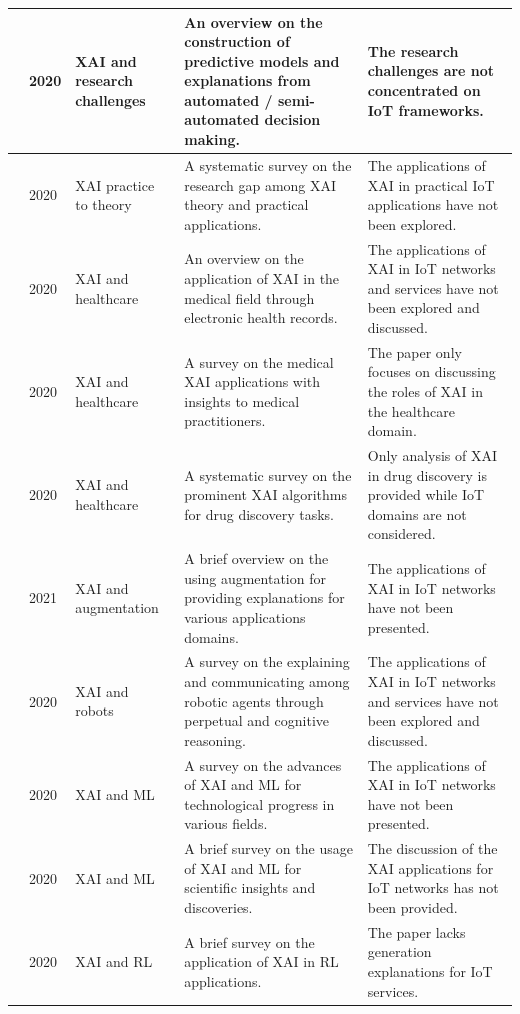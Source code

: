 \documentclass[journal]{IEEEtran}
\begin{document}
\begin{table}[!ht]
\begin{tabular}{|p{0.45cm}|p{0.5cm}|p{2.0cm}|p{7.45cm}|p{5.5cm}|}
\cite{longo2020explainable}  & 2020 & XAI and research challenges & An overview on the construction of predictive models and explanations from automated / semi-automated decision making. &  The research challenges are not concentrated on IoT frameworks. \\ \hline
\cite{fouladgar2020xai}  & 2020 & XAI practice to theory & A systematic survey on the research gap among XAI theory and practical applications. & The applications of XAI in practical IoT applications have not been explored.  \\ \hline
\cite{payrovnaziri2020explainable}  & 2020 & XAI and healthcare & An overview on the application of XAI in the medical field through electronic health records. & The applications of XAI in IoT networks and services have not been explored and discussed.  \\ \hline
\cite{tjoa2020survey}  & 2020 & XAI and healthcare & A survey on the medical XAI applications with insights to medical practitioners. & The paper only focuses on discussing the roles of XAI in the healthcare domain.  \\ \hline
\cite{jimenez2020drug}  & 2020 &  XAI and healthcare &   A systematic survey on the prominent XAI algorithms for drug discovery tasks. & Only analysis of XAI in drug discovery is provided while IoT domains are not considered. \\ \hline
\cite{vassiliades2021argumentation}  & 2021 & XAI and augmentation & A brief overview on the using augmentation for providing explanations for various applications domains. & The applications of XAI in IoT networks have not been presented.  \\ \hline
\cite{sado2020explainable}  & 2020 & XAI and robots & A survey on the explaining and communicating among robotic agents through perpetual and cognitive reasoning. & The applications of XAI in IoT networks and services have not been explored and discussed.  \\ \hline
\cite{emmert2020explainable}  & 2020 & XAI and ML & A survey on the advances of XAI and ML for technological progress in various fields. & The applications of XAI in IoT networks have not been presented.  \\ \hline
\cite{roscher2020explainable}  & 2020 & XAI and ML & A brief survey on the usage of XAI and ML for scientific insights and discoveries. & The discussion of the XAI applications for IoT networks has not been provided.  \\ \hline
\cite{puiutta2020explainable}  & 2020 & XAI and RL & A brief survey on the application of XAI in RL applications. & The paper lacks generation explanations for IoT services.  \\ \hline

\end{tabular}
\end{table}
\end{document}
